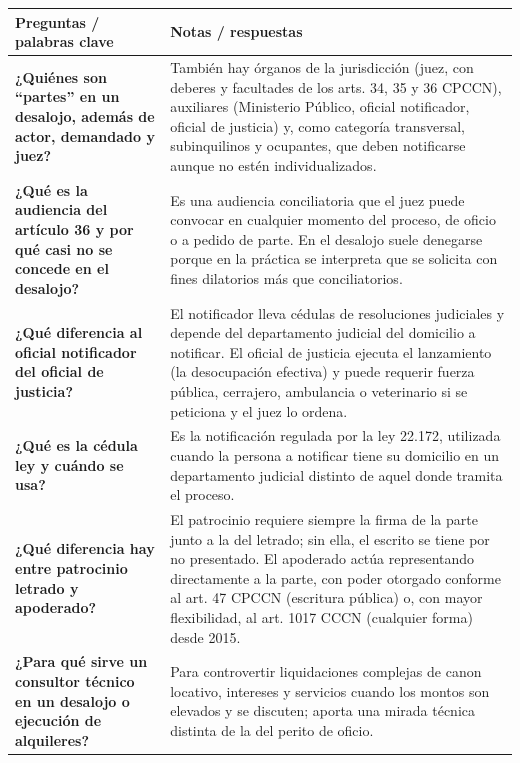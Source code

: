 \documentclass[12pt,oneside]{book}
\begin{document}
\begin{table}[H]
\centering
\begin{tabularx}{\textwidth}{
    >{\raggedright\arraybackslash}p{}
    >{\raggedright\arraybackslash}X
}
\toprule
\textbf{Preguntas / palabras clave} & \textbf{Notas / respuestas} \\
\midrule

\textbf{¿Quiénes son ``partes'' en un desalojo, además de actor, demandado y juez?} &
También hay órganos de la jurisdicción (juez, con deberes y facultades de los arts. 34, 35 y 36 CPCCN), auxiliares (Ministerio Público, oficial notificador, oficial de justicia) y, como categoría transversal, subinquilinos y ocupantes, que deben notificarse aunque no estén individualizados. \\

\textbf{¿Qué es la audiencia del artículo 36 y por qué casi no se concede en el desalojo?} &
Es una audiencia conciliatoria que el juez puede convocar en cualquier momento del proceso, de oficio o a pedido de parte. En el desalojo suele denegarse porque en la práctica se interpreta que se solicita con fines dilatorios más que conciliatorios. \\

\textbf{¿Qué diferencia al oficial notificador del oficial de justicia?} &
El notificador lleva cédulas de resoluciones judiciales y depende del departamento judicial del domicilio a notificar. El oficial de justicia ejecuta el lanzamiento (la desocupación efectiva) y puede requerir fuerza pública, cerrajero, ambulancia o veterinario si se peticiona y el juez lo ordena. \\

\textbf{¿Qué es la cédula ley y cuándo se usa?} &
Es la notificación regulada por la ley 22.172, utilizada cuando la persona a notificar tiene su domicilio en un departamento judicial distinto de aquel donde tramita el proceso. \\

\textbf{¿Qué diferencia hay entre patrocinio letrado y apoderado?} &
El patrocinio requiere siempre la firma de la parte junto a la del letrado; sin ella, el escrito se tiene por no presentado. El apoderado actúa representando directamente a la parte, con poder otorgado conforme al art. 47 CPCCN (escritura pública) o, con mayor flexibilidad, al art. 1017 CCCN (cualquier forma) desde 2015. \\

\textbf{¿Para qué sirve un consultor técnico en un desalojo o ejecución de alquileres?} &
Para controvertir liquidaciones complejas de canon locativo, intereses y servicios cuando los montos son elevados y se discuten; aporta una mirada técnica distinta de la del perito de oficio. \\


\end{tabularx}
\end{table}
\end{document}
